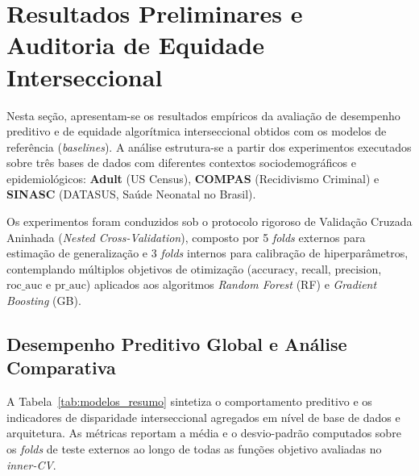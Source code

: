
\section{Resultados Preliminares e Auditoria de Equidade Interseccional}
\label{sec:resultados_preliminares}

Nesta seção, apresentam-se os resultados empíricos da avaliação de desempenho preditivo e de equidade algorítmica interseccional obtidos com os modelos de referência (\textit{baselines}). A análise estrutura-se a partir dos experimentos executados sobre três bases de dados com diferentes contextos sociodemográficos e epidemiológicos: \textbf{Adult} (US Census), \textbf{COMPAS} (Recidivismo Criminal) e \textbf{SINASC} (DATASUS, Saúde Neonatal no Brasil).

Os experimentos foram conduzidos sob o protocolo rigoroso de Validação Cruzada Aninhada (\textit{Nested Cross-Validation}), composto por 5 \textit{folds} externos para estimação de generalização e 3 \textit{folds} internos para calibração de hiperparâmetros, contemplando múltiplos objetivos de otimização ($\text{accuracy}$, $\text{recall}$, $\text{precision}$, $\text{roc\_auc}$ e $\text{pr\_auc}$) aplicados aos algoritmos \textit{Random Forest} (RF) e \textit{Gradient Boosting} (GB).

\subsection{Desempenho Preditivo Global e Análise Comparativa}
\label{subsec:desempenho_global}

A Tabela~\ref{tab:modelos_resumo} sintetiza o comportamento preditivo e os indicadores de disparidade interseccional agregados em nível de base de dados e arquitetura. As métricas reportam a média e o desvio-padrão computados sobre os \textit{folds} de teste externos ao longo de todas as funções objetivo avaliadas no \textit{inner-CV}.

